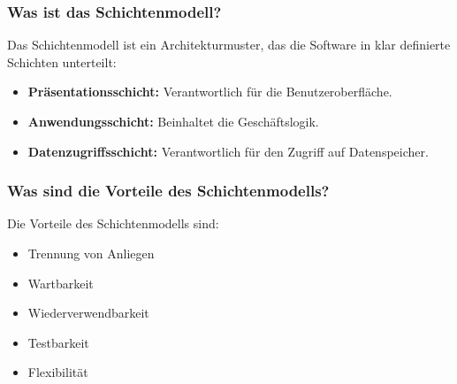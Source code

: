 \documentclass[main.tex]{subfiles}
\begin{document}
\subsubsection*{Was ist das \gls{Schichtenmodell}?}
Das \gls{Schichtenmodell} ist ein \gls{Architekturmuster}, das die Software in klar definierte Schichten unterteilt:
\begin{itemize}
    \item \textbf{Präsentationsschicht:} Verantwortlich für die Benutzeroberfläche.
    \item \textbf{Anwendungsschicht:} Beinhaltet die Geschäftslogik.
    \item \textbf{Datenzugriffsschicht:} Verantwortlich für den Zugriff auf Datenspeicher.
\end{itemize}

\subsubsection*{Was sind die Vorteile des \gls{Schichtenmodell}s?}
Die Vorteile des \gls{Schichtenmodell}s sind:
\begin{itemize}
    \item Trennung von Anliegen
    \item Wartbarkeit
    \item Wiederverwendbarkeit
    \item Testbarkeit
    \item Flexibilität
\end{itemize}
\end{document}
